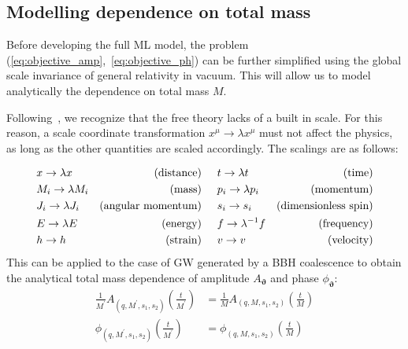 \subsection{Modelling dependence on total mass}
Before developing the full ML model, the problem (\ref{eq:objective_amp},~\ref{eq:objective_ph}) can be further simplified using the global scale invariance of general relativity in vacuum. This will allow us to model analytically the dependence on total mass $M$.
\par
Following~\cite{Arbey2019scaling}, we recognize that the free theory lacks of a built in scale. For this reason, a scale coordinate transformation $x^\mu \rightarrow \lambda x^\mu$ must not affect the physics, as long as the other quantities are scaled accordingly.
The scalings are as follows:
\par
{\footnotesize
\begin{alignat*}{4}
	&x \rightarrow \lambda x & \textrm{(distance)} \hskip0.5cm &t \rightarrow \lambda t & \textrm{(time)}\\
	&M_i \rightarrow \lambda M_i & \textrm{(mass)} \hskip0.5cm &p_i \rightarrow \lambda p_i & \textrm{(momentum)} \\
	&J_i \rightarrow \lambda J_i  & \textrm{(angular momentum)} \hskip0.5cm &s_i \rightarrow s_i & \textrm{(dimensionless spin)}\\
	&E \rightarrow \lambda E & \textrm{(energy)} \hskip0.5cm &f \rightarrow \lambda^{-1} f & \textrm{(frequency)}\\
	&h \rightarrow h & \textrm{(strain)} \hskip0.5cm &v \rightarrow v & \textrm{(velocity)} \\
\end{alignat*}
}
This can be applied to the case of GW generated by a BBH coalescence to obtain the analytical total mass dependence of amplitude $A_{\boldsymbol{\vartheta}}$ and phase ${\phi}_{\boldsymbol{\vartheta}}$:
\begin{align}
	\frac{1}{M^\prime} A_{(q, M^\prime, s_1, s_2)}\left(\frac{t}{M^\prime}\right) &= 	\frac{1}{M} A_{(q, M, s_1, s_2)}\left(\frac{t}{M}\right) \label{eq:amp_scaling}\\
	{\phi}_{(q, M^\prime, s_1, s_2)}\left(\frac{t}{M^\prime}\right) &= 	{\phi}_{(q, M, s_1, s_2)}\left(\frac{t}{M}\right)  \label{eq:ph_scaling}
\end{align}
